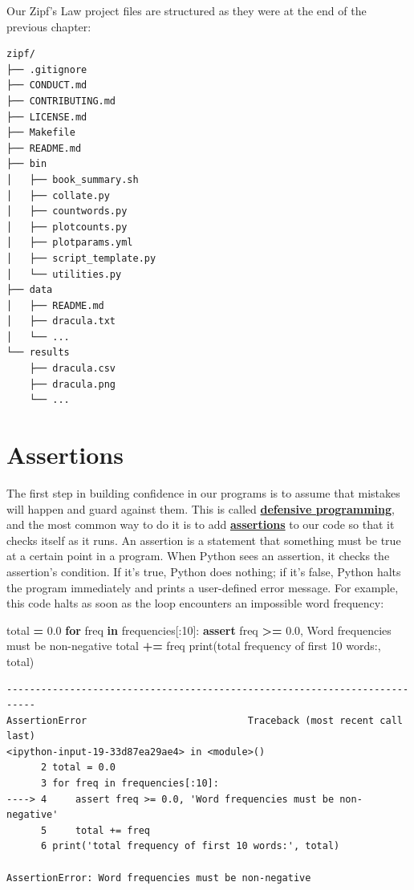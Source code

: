 \documentclass[
]{krantz}
\makeatletter
\newenvironment{Shaded}{\begin{snugshade}}{\end{snugshade}}
\newcommand{\BuiltInTok}[1]{#1}
\newcommand{\ControlFlowTok}[1]{\textcolor[rgb]{0.13,0.29,0.53}{\textbf{#1}}}
\newcommand{\DecValTok}[1]{\textcolor[rgb]{0.00,0.00,0.81}{#1}}
\newcommand{\FloatTok}[1]{\textcolor[rgb]{0.00,0.00,0.81}{#1}}
\newcommand{\KeywordTok}[1]{\textcolor[rgb]{0.13,0.29,0.53}{\textbf{#1}}}
\newcommand{\NormalTok}[1]{#1}
\newcommand{\OperatorTok}[1]{\textcolor[rgb]{0.81,0.36,0.00}{\textbf{#1}}}
\newcommand{\StringTok}[1]{\textcolor[rgb]{0.31,0.60,0.02}{#1}}
\newenvironment{kframe}{%
\medskip{}
\setlength{\fboxsep}{.8em}
 \def\at@end@of@kframe{}%
 \ifinner\ifhmode%
  \def\at@end@of@kframe{\end{minipage}}%
  \begin{minipage}{\columnwidth}%
 \fi\fi%
 \def\FrameCommand##1{\hskip\@totalleftmargin \hskip-\fboxsep
 \colorbox{shadecolor}{##1}\hskip-\fboxsep
     \hskip-\linewidth \hskip-\@totalleftmargin \hskip\columnwidth}%
 \MakeFramed {\advance\hsize-\width
   \@totalleftmargin\z@ \linewidth\hsize
   \@setminipage}}%
 {\par\unskip\endMakeFramed%
 \at@end@of@kframe}
\renewenvironment{Shaded}{\begin{kframe}}{\end{kframe}}
\newcommand{\gref}[2]{\hyperlink{#2}{\textbf{#1}}}
\makeatother
\begin{document}
Our Zipf's Law project files are structured as they were at the end of the previous chapter:

\begin{verbatim}
zipf/
├── .gitignore
├── CONDUCT.md
├── CONTRIBUTING.md
├── LICENSE.md
├── Makefile
├── README.md
├── bin
│   ├── book_summary.sh
│   ├── collate.py
│   ├── countwords.py
│   ├── plotcounts.py
│   ├── plotparams.yml
│   ├── script_template.py
│   └── utilities.py
├── data
│   ├── README.md
│   ├── dracula.txt
│   └── ...
└── results
    ├── dracula.csv
    ├── dracula.png
    └── ...
\end{verbatim}

\hypertarget{testing-assertions}{%
\section{Assertions}\label{testing-assertions}}

The first step in building confidence in our programs
is to assume that mistakes will happen and guard against them.
This is called \gref{defensive programming}{defensive\_programming},
and the most common way to do it is to add \gref{assertions}{assertion} to our code
so that it checks itself as it runs.
An assertion is a statement that something must be true at a certain point in a program.
When Python sees an assertion, it checks the assertion's condition.
If it's true, Python does nothing;
if it's false,
Python halts the program immediately and prints a user-defined error message.
For example,
this code halts as soon as the loop encounters an impossible word frequency:

\begin{Shaded}
\begin{Highlighting}[]
\NormalTok{total }\OperatorTok{=} \FloatTok{0.0}
\ControlFlowTok{for}\NormalTok{ freq }\KeywordTok{in}\NormalTok{ frequencies[:}\DecValTok{10}\NormalTok{]:}
    \ControlFlowTok{assert}\NormalTok{ freq }\OperatorTok{\textgreater{}=} \FloatTok{0.0}\NormalTok{, }\StringTok{\textquotesingle{}Word frequencies must be non{-}negative\textquotesingle{}}
\NormalTok{    total }\OperatorTok{+=}\NormalTok{ freq}
\BuiltInTok{print}\NormalTok{(}\StringTok{\textquotesingle{}total frequency of first 10 words:\textquotesingle{}}\NormalTok{, total)}
\end{Highlighting}
\end{Shaded}

\begin{verbatim}
---------------------------------------------------------------------------
AssertionError                            Traceback (most recent call last)
<ipython-input-19-33d87ea29ae4> in <module>()
      2 total = 0.0
      3 for freq in frequencies[:10]:
----> 4     assert freq >= 0.0, 'Word frequencies must be non-negative'
      5     total += freq
      6 print('total frequency of first 10 words:', total)

AssertionError: Word frequencies must be non-negative
\end{verbatim}
\end{document}

